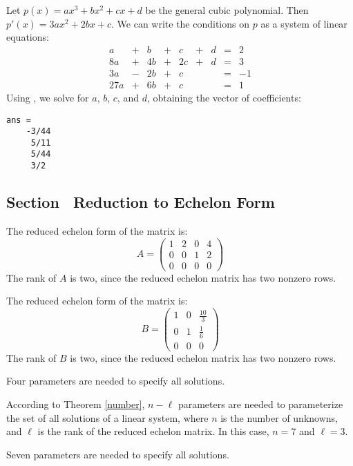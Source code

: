 \soln Let $p(x) = ax^3 + bx^2 + cx + d$ be the general cubic polynomial. 
Then $p'(x) = 3ax^2 + 2bx + c$.  We can write the conditions on $p$ as a
system of linear equations:
\[
\begin{array}{rrrrrrrrr}
a & + & b & + & c & + & d & = & 2 \\
8a & + & 4b & + & 2c & + & d & = & 3 \\
3a & - & 2b & + & c & & & = & -1 \\
27a & + & 6b & + & c & & & = & 1\end{array}
\]
Using \Matlab, we solve for $a$, $b$, $c$, and $d$, obtaining the
vector of coefficients:
\begin{verbatim}
ans =
    -3/44
     5/11
     5/44
     3/2
\end{verbatim}





\subsection*{Section~\protect{\ref{S:2.4}} Reduction to Echelon Form}

The reduced echelon form of the matrix is:
\[
A = \left(\begin{array}{rrrr} 1 & 2 & 0 & 4 \\ 0 & 0 & 1 & 2 \\ 0 & 0 & 0
& 0\end{array}\right)
\]
The rank of $A$ is two, since the reduced echelon matrix has two nonzero
rows.

The reduced echelon form of the matrix is:
\[
B=\left(\begin{array}{rrr} 1 & 0 & \frac{10}{3} \\ 
0 & 1 & \frac{1}{6} \\ 0 & 0 & 0 \end{array}\right)
\]
The rank of $B$ is two, since the reduced echelon matrix has two nonzero
rows.

\ans Four parameters are needed to specify all solutions.

\soln According to Theorem \ref{number}, $n - \ell$
parameters are needed to parameterize the set of all solutions of a
linear system, where $n$ is the number of unknowns, and $\ell$ is the
rank of the reduced echelon matrix.  In this case, $n = 7$ and $\ell =
3$.

\ans Seven parameters are needed to specify all solutions.

